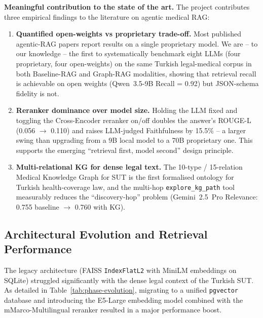 \documentclass[11pt, a4paper]{article}
\begin{document}
\textbf{Meaningful contribution to the state of the art.} The project contributes three empirical findings to the literature on agentic medical RAG:
\begin{enumerate}[leftmargin=*]
    \item \textbf{Quantified open-weights vs proprietary trade-off.} Most published agentic-RAG papers report results on a single proprietary model. We are -- to our knowledge -- the first to systematically benchmark eight LLMs (four proprietary, four open-weights) on the same Turkish legal-medical corpus in both Baseline-RAG and Graph-RAG modalities, showing that retrieval recall is achievable on open weights (Qwen~3.5-9B Recall = 0.92) but JSON-schema fidelity is not.
    \item \textbf{Reranker dominance over model size.} Holding the LLM fixed and toggling the Cross-Encoder reranker on/off doubles the answer's ROUGE-L (0.056 $\to$ 0.110) and raises LLM-judged Faithfulness by 15.5\% -- a larger swing than upgrading from a 9B local model to a 70B proprietary one. This supports the emerging ``retrieval first, model second'' design principle.
    \item \textbf{Multi-relational KG for dense legal text.} The 10-type / 15-relation Medical Knowledge Graph for SUT is the first formalised ontology for Turkish health-coverage law, and the multi-hop \texttt{explore\_kg\_path} tool measurably reduces the ``discovery-hop'' problem (Gemini~2.5~Pro Relevance: 0.755 baseline $\to$ 0.760 with KG).
\end{enumerate}

\subsection{Architectural Evolution and Retrieval Performance}

The legacy architecture (FAISS \texttt{IndexFlatL2} with MiniLM embeddings on SQLite) struggled significantly with the dense legal context of the Turkish SUT. As detailed in Table~\ref{tab:phase-evolution}, migrating to a unified \texttt{pgvector} database and introducing the E5-Large embedding model combined with the mMarco-Multilingual reranker resulted in a major performance boost.
\end{document}
